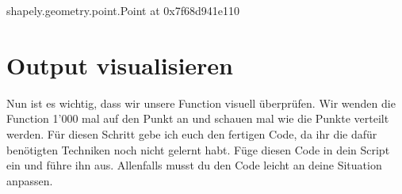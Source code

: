 \documentclass[letterpaper,10pt,english]{sphinxmanual}
\begin{document}
\begin{sphinxVerbatim}[commandchars=\\\{\}]
    
      
      

      

        
        

       


 
\end{sphinxVerbatim}

\begin{sphinxVerbatim}[commandchars=\\\{\}]
\PYGZlt{}shapely.geometry.point.Point at 0x7f68d941e110\PYGZgt{}
\end{sphinxVerbatim}


\section{Output visualisieren}
\label{\detokenize{02_04_Einzelpunkt_Verschieben:output-visualisieren}}
Nun ist es wichtig, dass wir unsere Function visuell überprüfen. Wir wenden die Function 1’000 mal auf den Punkt  an und schauen mal wie die Punkte verteilt werden. Für diesen Schritt gebe ich euch den fertigen Code, da ihr die dafür benötigten Techniken noch nicht gelernt habt. Füge diesen Code in dein Script ein und führe ihn aus. Allenfalls musst du den Code leicht an deine Situation anpassen.

\begin{sphinxVerbatim}[commandchars=\\\{\}]
  \PYG{p}{[}    \PYG{p}{]}
     
\end{sphinxVerbatim}
\end{document}
